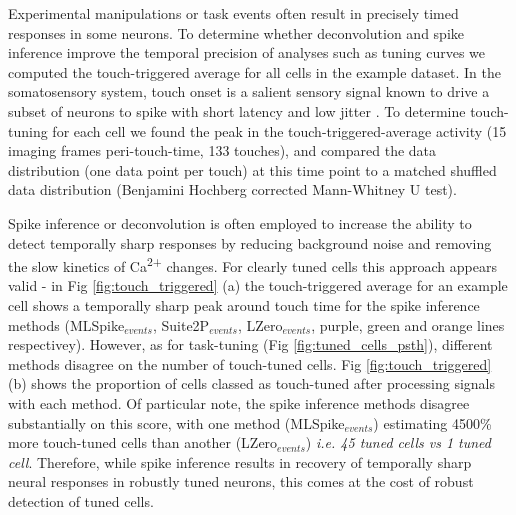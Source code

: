\documentclass[a4paper,10pt,twocolumn]{article}
\begin{document}
Experimental manipulations or task events often result in precisely timed responses in some neurons. To determine whether deconvolution and spike inference improve the temporal precision of analyses such as tuning curves we computed the touch-triggered average for all cells in the example dataset. In the somatosensory system, touch onset is a salient sensory signal known to drive a subset of neurons to spike with short latency and low jitter \citep{OConnor2010-hd, Hires2015-by}. To determine touch-tuning for each cell we found the peak in the touch-triggered-average activity (15 imaging frames peri-touch-time, 133 touches), and compared the data distribution (one data point per touch) at this time point to a matched shuffled data distribution (Benjamini Hochberg corrected Mann-Whitney U test). 

Spike inference or deconvolution is often employed to increase the ability to detect temporally sharp responses by reducing background noise and removing the slow kinetics of Ca\textsuperscript{2+} changes. For clearly tuned cells this approach appears valid - in Fig \ref{fig:touch_triggered} (a) the touch-triggered average for an example cell shows a temporally sharp peak around touch time for the spike inference methods (MLSpike$_{events}$, Suite2P$_{events}$, LZero$_{events}$, purple, green and orange lines respectivey). However, as for task-tuning (Fig \ref{fig:tuned_cells_psth}), different methods disagree on the number of touch-tuned cells. Fig \ref{fig:touch_triggered} (b) shows the proportion of cells classed as touch-tuned after processing signals with each method. Of particular note, the spike inference methods disagree substantially on this score, with one method (MLSpike$_{events}$) estimating 4500\% more touch-tuned cells than another (LZero$_{events}$) \emph{i.e. 45 tuned cells vs 1 tuned cell}. Therefore, while spike inference results in recovery of temporally sharp neural responses in robustly tuned neurons, this comes at the cost of robust detection of tuned cells.


\end{document}
